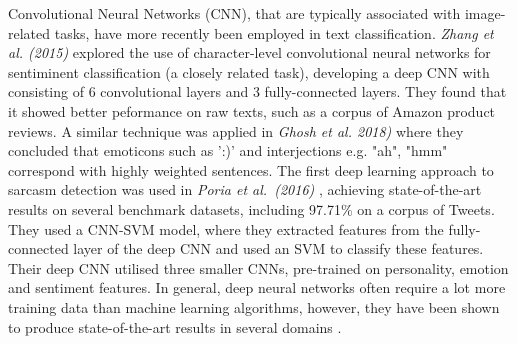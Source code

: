 \documentclass[12pt,a4paper]{article}
\begin{document}
Convolutional Neural Networks (CNN), that are typically associated with image-related tasks, have more recently been employed in text classification. \textit{Zhang et al. (2015)} \cite{zhang2015character} explored the use of character-level convolutional neural networks for sentiminent classification (a closely related task), developing a deep CNN with consisting of 6 convolutional layers and 3 fully-connected layers. They found that it showed better peformance on raw texts, such as a corpus of Amazon product reviews. A similar technique was applied in \textit{Ghosh et al. 2018)} \cite{ghosh2018sarcasm} where they concluded that emoticons such as ':)' and interjections e.g. "ah", "hmm" correspond with highly weighted sentences. The first deep learning approach to sarcasm detection was used in \textit{Poria et al.\ (2016)} \cite{poria2016deeper}, achieving state-of-the-art results on several benchmark datasets, including 97.71\% on a corpus of Tweets. They used a CNN-SVM model, where they extracted features from the fully-connected layer of the deep CNN and used an SVM to classify these features. Their deep CNN utilised three smaller CNNs, pre-trained on personality, emotion and sentiment features. In general, deep neural networks often require a lot more training data than machine learning algorithms, however, they have been shown to produce state-of-the-art results in several domains \cite{lecun2015deep}.



\end{document}
